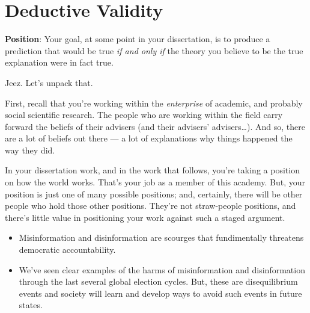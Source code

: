 \documentclass[
  letterpaper,
  DIV=11,
  numbers=noendperiod]{scrreprt}
\begin{document}
\section{Deductive Validity}\label{deductive-validity}

\textbf{Position}: Your goal, at some point in your dissertation, is to
produce a prediction that would be true \emph{if and only if} the theory
you believe to be the true explanation were in fact true.

Jeez. Let's unpack that.

First, recall that you're working within the \emph{enterprise} of
academic, and probably social scientific research. The people who are
working within the field carry forward the beliefs of their advisers
(and their advisers' advisers\ldots). And so, there are a lot of beliefs
out there --- a lot of explanations why things happened the way they
did.

In your dissertation work, and in the work that follows, you're taking a
position on how the world works. That's your job as a member of this
academy. But, your position is just one of many possible positions; and,
certainly, there will be other people who hold those other positions.
They're not straw-people positions, and there's little value in
positioning your work against such a staged argument.

\begin{tcolorbox}[enhanced jigsaw, bottomtitle=1mm, coltitle=black, colback=white, colframe=quarto-callout-note-color-frame, title=\textcolor{quarto-callout-note-color}{\faInfo}\hspace{0.5em}{Examples of Differing Positions}, opacityback=0, arc=.35mm, titlerule=0mm, leftrule=.75mm, toptitle=1mm, rightrule=.15mm, opacitybacktitle=0.6, colbacktitle=quarto-callout-note-color!10!white, toprule=.15mm, left=2mm, bottomrule=.15mm, breakable]

\begin{itemize}
\item
  Misinformation and disinformation are scourges that fundimentally
  threatens democratic accountability.
\item
  We've seen clear examples of the harms of misinformation and
  disinformation through the last several global election cycles. But,
  these are disequilibrium events and society will learn and develop
  ways to avoid such events in future states.
\end{itemize}

\end{tcolorbox}
\end{document}
